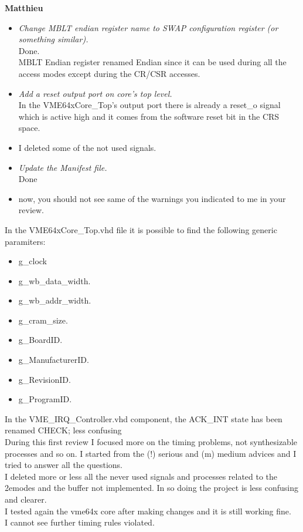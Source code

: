 \documentclass[a4paper,11pt]{article}
\begin{document}
\begin{center}
\LARGE{\textbf{Matthieu}}
\end{center}
\begin{itemize}
\item \textit{Change MBLT endian register name to SWAP configuration register 
(or something similar).}\\
Done.\\
MBLT Endian register renamed Endian since it can be used during all the access 
modes except during the CR/CSR accesses.
\item \textit{Add a reset output port on core's top level.}\\
In the VME64xCore\_Top's output port there is already a reset\_o signal which is active high and it comes from the software reset bit in the CRS space.
\item I deleted some of the not used signals.
\item \textit{Update the Manifest file.}\\
Done
\item now, you should not see same of the warnings you indicated to me in your 
review.
\end{itemize}
\newpage
In the VME64xCore\_Top.vhd file it is possible to find the following generic paramiters:\\
\begin{itemize}
\item g\_clock
\item g\_wb\_data\_width.
\item g\_wb\_addr\_width.
\item g\_cram\_size.
\item g\_BoardID.
\item g\_ManufacturerID.
\item g\_RevisionID.
\item g\_ProgramID.
\end{itemize}

In the VME\_IRQ\_Controller.vhd component, the ACK\_INT state has been renamed CHECK; less confusing\\

During this first review I focused more on the timing problems, not synthesizable processes and so on.
I started from the (!) serious and (m) medium advices and I tried 
to answer all the questions. \\
I deleted more or less all the never used signals and processes related to the 2emodes and the buffer not implemented. In so doing the project is less 
confusing and clearer.\\
I tested again the vme64x core after making changes and it is still working fine.\\
I cannot see further timing rules violated.\\
\end{document}

